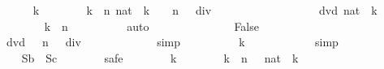 \begin{isabellebody}
\isanewline
\ \ \ \ \ \ \isamarkupfalse%
\ k\isanewline
\ \ \ \ \ \ \isamarkupfalse%
\ {\isachardoublequoteopen}k\ {\isasymin}\ {\isacharbraceleft}{}{\isachardot}{\isachardot}{\isacharless}n{\isacharbraceright}{\isachardoublequoteclose}\ {\isachardoublequoteopen}{\isacharparenleft}{}{\isacharcolon}{\isacharcolon}nat{\isacharparenright}\ {\isacharcircum}\ k\ {\isacharequal}\ {\isacharparenleft}{}\ {\isacharcircum}\ n\ {\isacharplus}\ {}{\isacharparenright}\ div\ {}\ {\isacharminus}\ {}{\isachardoublequoteclose}\isanewline
\ \ \ \ \ \ \isamarkupfalse%
\isanewline
\ \ \ \ \ \ \isamarkupfalse%
\ {\isachardoublequoteopen}{}\ dvd\ {\isacharparenleft}{}{\isacharcolon}{\isacharcolon}nat{\isacharparenright}\ {\isacharcircum}\ k{\isachardoublequoteclose}\isanewline
\ \ \ \ \ \ \ \ \isamarkupfalse%
\ {\isacharbackquoteopen}k\ {\isasymin}\ {\isacharbraceleft}{}{\isachardot}{\isachardot}{\isacharless}n{\isacharbraceright}{\isacharbackquoteclose}\isanewline
\ \ \ \ \ \ \ \ \isamarkupfalse%
\ auto\isanewline
\ \ \ \ \ \ \isamarkupfalse%
\isanewline
\ \ \ \ \ \ \isamarkupfalse%
\ False\isanewline
\ \ \ \ \ \ \ \ \isamarkupfalse%
\ {\isacharbackquoteopen}{\isasymnot}\ {}\ dvd\ {\isacharparenleft}{}\ {\isacharcircum}\ n\ {\isacharplus}\ {}{\isacharparenright}\ div\ {}\ {\isacharminus}\ {}{\isacharbackquoteclose}\isanewline
\ \ \ \ \ \ \ \ \isamarkupfalse%
\ simp\isanewline
\ \ \ \ \ \ \isamarkupfalse%
\ {\isachardoublequoteopen}{}\ {\isacharcircum}\ k\ {\isasymin}\ {\isacharbraceleft}{\isacharbraceright}{\isachardoublequoteclose}\isanewline
\ \ \ \ \ \ \ \ \isamarkupfalse%
\ simp\isanewline
\ \ \ \ \isamarkupfalse%
\isanewline
\isanewline
\ \ \ \ \isamarkupfalse%
\isanewline
\isanewline
\ \ \ \ \isamarkupfalse%
\ {\isachardoublequoteopen}{\isacharquery}Sb\ {\isasyminter}\ {\isacharquery}Sc\ {\isacharequal}\ {\isacharbraceleft}{\isacharbraceright}{\isachardoublequoteclose}\isanewline
\ \ \ \ \isamarkupfalse%
\ safe\isanewline
\ \ \ \ \ \ \isamarkupfalse%
\ k\isanewline
\ \ \ \ \ \ \isamarkupfalse%
\ {\isachardoublequoteopen}k\ {\isasymin}\ {\isacharbraceleft}{}{\isachardot}{\isachardot}{\isacharless}n{\isacharbraceright}{\isachardoublequoteclose}\ {\isachardoublequoteopen}{}\ {\isacharasterisk}\ {\isacharparenleft}{}{\isacharcolon}{\isacharcolon}nat{\isacharparenright}\ {\isacharcircum}\ k\ {\isacharequal}\ {}{\isachardoublequoteclose}\isanewline

\end{isabellebody}
